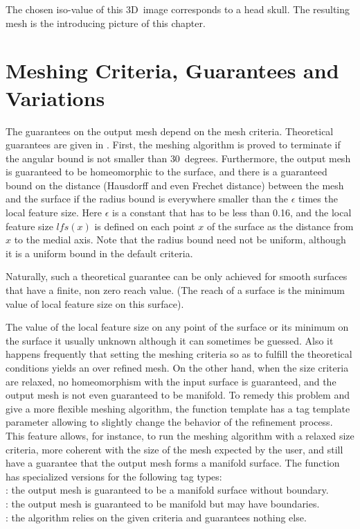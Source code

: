 The chosen iso-value of this 3D~image corresponds to a head skull. The
resulting mesh is the introducing picture of this chapter.


\section{Meshing Criteria, Guarantees and Variations\label{SurfaceMesher_section_criteria}}
\label{SurfaceMesher_section_variations}

The guarantees on the output mesh depend on the mesh criteria.
Theoretical guarantees are given in \cite{cgal:bo-pgsms-05}.
First, the meshing algorithm is proved to terminate 
if the angular bound is
not smaller than $30$~degrees. 
Furthermore, the output mesh 
is guaranteed to be homeomorphic to the surface,
and  there is a guaranteed bound 
on the  distance (Hausdorff and even Frechet distance)
between the mesh and the surface
if the radius bound is everywhere smaller than 
the $\epsilon$ times the local feature size. 
Here $\epsilon$ is a constant that has to be
less than 0.16, and the local feature size 
$lfs(x)$ is defined on each point $x$ of the surface
as the distance from $x$ to the medial axis.  
Note that the radius bound need not be uniform,
although it is a uniform bound in the default criteria.

Naturally, such a theoretical guarantee can be only achieved
for smooth surfaces that have a finite, non zero
reach value. (The reach of a surface is the minimum value 
of local feature size on
this surface).

The value of the local feature size on any point of the surface
or its minimum on the surface it usually unknown
although it can sometimes be guessed. Also it happens frequently
that setting the meshing criteria so as to fulfill the theoretical
conditions yields an over refined mesh.
On the other hand, when the size criteria are relaxed,
no homeomorphism with the input surface is guaranteed,
and the output mesh is not even guaranteed to be manifold.
To remedy this problem and give a more flexible
meshing algorithm, the function template
 has a tag template parameter
allowing to slightly change the behavior of the refinement process.
This feature allows, for instance,  to run the meshing
algorithm with a relaxed size criteria, more coherent
with the size of the mesh expected by the user,
and still have a guarantee that
the output mesh forms a manifold surface.
The function  has specialized versions
for the following  tag types: \\
: the output mesh is guaranteed to be a manifold
surface without boundary.\\
: the output mesh is guaranteed to be
manifold but may have boundaries.\\
: the algorithm relies on the given criteria and
guarantees nothing else.




